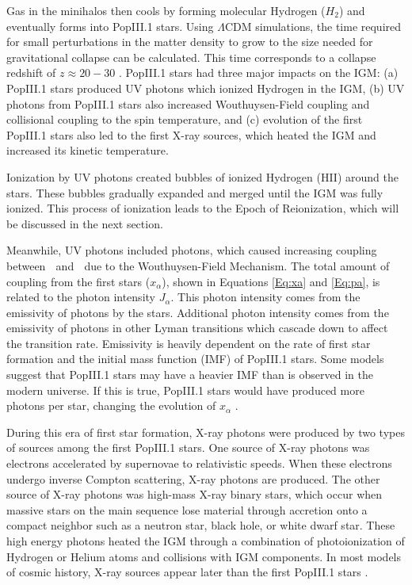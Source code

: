Gas in the minihalos then cools by forming molecular Hydrogen ($H_2$) and eventually forms into PopIII.1 stars. Using $\Lambda$CDM simulations, the time required for small perturbations in the matter density to grow to the size needed for gravitational collapse can be calculated. This time corresponds to a collapse redshift of $z \approx 20-30$ \cite{bromm_2013}. PopIII.1 stars had three major impacts on the IGM: (a) PopIII.1 stars produced UV photons which ionized Hydrogen in the IGM, (b) UV photons from PopIII.1 stars also increased Wouthuysen-Field coupling and collisional coupling to the spin temperature, and (c) evolution of the first PopIII.1 stars also led to the first X-ray sources, which heated the IGM and increased its kinetic temperature.


Ionization by UV photons created bubbles of ionized Hydrogen (HII) around the stars. These bubbles gradually expanded and merged until the IGM was fully ionized. This process of ionization leads to the Epoch of Reionization, which will be discussed in the next section.

Meanwhile, UV photons included \lya  photons, which caused increasing coupling between \ts $\;$ and \tk $\;$ due to the Wouthuysen-Field Mechanism. The total amount of coupling from the first stars ($x_\alpha$), shown in Equations \ref{Eq:xa} and \ref{Eq:pa}, is related to the \lya  photon intensity $J_\alpha$. This photon intensity comes from the emissivity of \lya photons by the stars. Additional photon intensity comes from the emissivity of photons in other Lyman transitions which cascade down to affect the \lya  transition rate. Emissivity is heavily dependent on the rate of first star formation and the initial mass function (IMF) of PopIII.1 stars. Some models suggest that PopIII.1 stars may have a heavier IMF than is observed in the modern universe. If this is true, PopIII.1 stars would have produced more \lya  photons per star, changing the evolution of $x_\alpha$ \cite{natarajan_2014}. 

During this era of first star formation, X-ray photons were produced by two types of sources among the first PopIII.1 stars. One source of X-ray photons was electrons accelerated by supernovae to relativistic speeds. When these electrons undergo inverse Compton scattering, X-ray photons are produced. The other source of X-ray photons was high-mass X-ray binary stars, which occur when massive stars on the main sequence lose material through accretion onto a compact neighbor such as a neutron star, black hole, or white dwarf star. These high energy photons heated the IGM through a combination of photoionization of Hydrogen or Helium atoms and collisions with IGM components. In most models of cosmic history, X-ray sources appear later than the first PopIII.1 stars \cite{furlanetto_2006}. 

